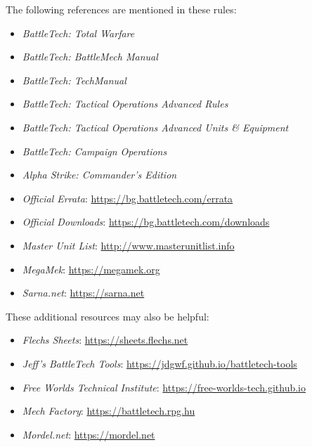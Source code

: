 The following references are mentioned in these rules:

\begin{itemize}

\item \emph{BattleTech: Total Warfare}

\item \emph{BattleTech: BattleMech Manual}

\item \emph{BattleTech: TechManual}

\item \emph{BattleTech: Tactical Operations Advanced Rules}

\item \emph{BattleTech: Tactical Operations Advanced Units \& Equipment}

\item \emph{BattleTech: Campaign Operations}

\item \emph{Alpha Strike: Commander's Edition}

\item \emph{Official Errata}: \href{https://bg.battletech.com/errata}{https://bg.battletech.com/errata}

\item \emph{Official Downloads}: \href{https://bg.battletech.com/downloads}{https://bg.battletech.com/downloads}

\item \emph{Master Unit List}: \href{http://www.masterunitlist.info}{http://www.masterunitlist.info}

\item \emph{MegaMek}: \href{https://megamek.org}{https://megamek.org}

\item \emph{Sarna.net}: \href{https://sarna.net}{https://sarna.net}

\end{itemize}

These additional resources may also be helpful:

\begin{itemize}

\item \emph{Flechs Sheets}: \href{https://sheets.flechs.net}{https://sheets.flechs.net}

\item \emph{Jeff's BattleTech Tools}: \href{https://jdgwf.github.io/battletech-tools}{https://jdgwf.github.io/battletech-tools}

\item \emph{Free Worlds Technical Institute}: \href{https://free-worlds-tech.github.io}{https://free-worlds-tech.github.io}

\item \emph{Mech Factory}: \href{https://battletech.rpg.hu}{https://battletech.rpg.hu}

\item \emph{Mordel.net}: \href{https://mordel.net}{https://mordel.net}

\end{itemize}

